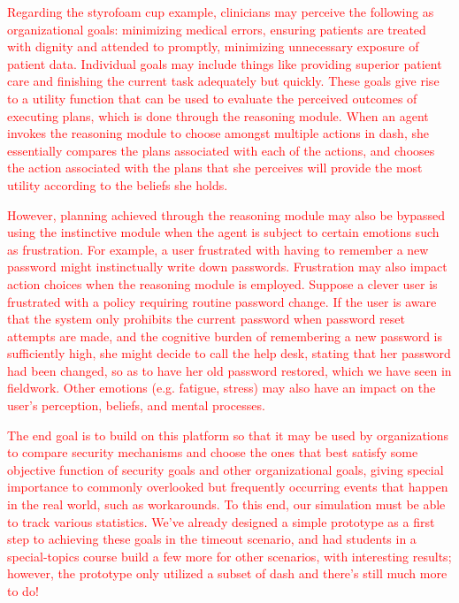\documentclass{acm_proc_article-sp}
\begin{document}
\textcolor{red}{Regarding the styrofoam cup example, clinicians may perceive the 
following as organizational goals: minimizing medical errors, ensuring patients 
are treated with dignity and attended to promptly, minimizing unnecessary 
exposure of patient data. Individual goals may include things like providing 
superior patient care and finishing the current task adequately but quickly. 
These goals give rise to a utility function that can be used to evaluate the 
perceived outcomes of executing plans, which is done through 
the reasoning module. When an agent invokes the reasoning module to 
choose amongst multiple actions in {\sc dash}, she essentially compares the 
plans associated with each of the actions, and chooses the action associated
with the plans that she perceives will provide the most utility according to the 
beliefs she holds.}
 
\textcolor{red}{However, planning achieved through the reasoning module
may also be bypassed using the instinctive module when the agent is subject to certain 
emotions such as frustration. For example, a user frustrated with having to 
remember a new password might instinctually write down passwords.
Frustration may also impact action choices when the reasoning 
module is employed. Suppose a clever user is frustrated with a policy requiring
routine password change. If the user is aware that the system only prohibits 
the current password when password reset attempts are made, and the 
cognitive burden of remembering a new password is sufficiently high, 
she might decide to call the help desk, stating that her password had been 
changed, so as to have her old password restored, which we have seen in fieldwork. 
Other emotions (e.g. fatigue, stress) may also have an impact on the user's 
perception, beliefs, and mental processes.}
 
\textcolor{red}{The end goal is to build on this platform so that it may be 
used by organizations to compare security mechanisms and choose the 
ones that best satisfy some objective function of security goals 
and other organizational goals, giving special importance to commonly 
overlooked but frequently occurring events that happen in the real world, 
such as workarounds. To this end, our simulation must be able to 
track various statistics. We've already designed a simple prototype as a first 
step to achieving these goals in the timeout scenario, and had students in 
a special-topics course build a few more for other scenarios, with
interesting results; however, the prototype only utilized a subset of {\sc dash} 
and there's still much more to do!}
\end{document}

